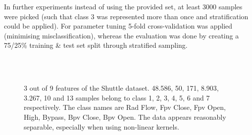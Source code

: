 \par In further experiments instead of using the provided set, at least 3000 samples were picked (such that class 3 was represented more than once and stratification could be applied). For parameter tuning 5-fold cross-validation was applied (minimising misclassification), whereas the evaluation was done by creating a 75/25\% training \& test set split through stratified sampling.


\begin{figure}[!htb]
\centering
%
\\
\\
\caption{3 out of 9 features of the Shuttle dataset. 48.586, 50, 171, 8.903, 3.267, 10 and 13 samples belong to class 1, 2, 3, 4, 5, 6 and 7 respectively. The class names are Rad Flow, Fpv Close, Fpv Open, High, Bypass, Bpv Close, Bpv Open. The data appears reasonably separable, especially when using non-linear kernels.}
\label{shuttlehist}
\end{figure}

